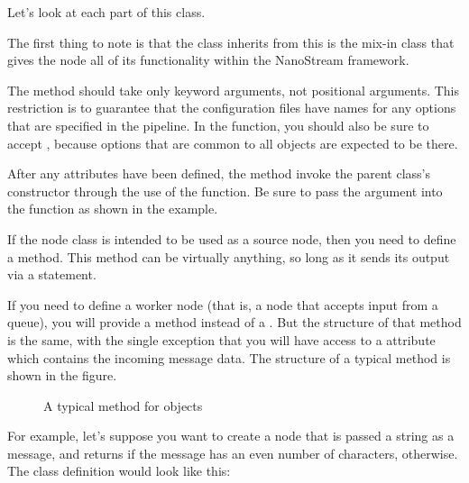 \documentclass[letterpaper,10pt,english]{sphinxmanual}
\let\sphinxpxdimen\pdfpxdimen\else\newdimen\sphinxpxdimen
\begin{document}
Let’s look at each part of this class.

The first thing to note is that the class inherits from  \textendash{} this
is the mix-in class that gives the node all of its functionality within the
NanoStream framework.

The  method should take only keyword arguments, not positional
arguments. This restriction is to guarantee that the configuration files have
names for any options that are specified in the pipeline. In the 
function, you should also be sure to accept , because options that
are common to all  objects are expected to be there.

After any attributes have been defined, the  method 
invoke the parent class’s constructor through the use of the 
function. Be sure to pass the  argument into the function as
shown in the example.

If the node class is intended to be used as a source node, then you need to
define a  method. This method can be virtually anything, so long
as it sends its output via a  statement.

If you need to define a worker node (that is, a node that accepts input
from a queue), you will provide a  method instead of a
. But the structure of that method is the same, with the single
exception that you will have access to a  attribute which
contains the incoming message data. The structure of a typical 
method is shown in the figure.

\begin{figure}[htbp]
\centering
\capstart

\noindent\sphinxincludegraphics[width=400\sphinxpxdimen]{{process_item}.png}
\caption{A typical  method for  objects}\label{\detokenize{overview:id3}}\end{figure}

For example, let’s suppose you want to create a node that is passed a string as a
message, and returns  if the message has an even number of
characters,  otherwise. The class definition would look like
this:
\end{document}
